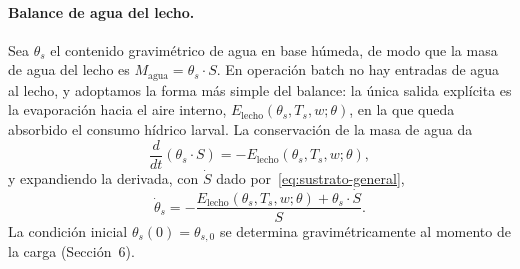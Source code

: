 \paragraph{Balance de agua del lecho.} Sea $\theta_s$ el contenido gravim\'etrico de agua en base h\'umeda, de modo que la masa de agua del lecho es $M_{\mathrm{agua}} = \theta_s \cdot S$. En operaci\'on batch no hay entradas de agua al lecho, y adoptamos la forma m\'as simple del balance: la \'unica salida expl\'icita es la evaporaci\'on hacia el aire interno, $E_{\mathrm{lecho}}(\theta_s, T_s, w; \theta)$, en la que queda absorbido el consumo h\'idrico larval. La conservaci\'on de la masa de agua da
\begin{equation}
\frac{d}{dt}\left(\theta_s \cdot S\right) = -E_{\mathrm{lecho}}(\theta_s, T_s, w; \theta),
\label{eq:agua-lecho}
\end{equation}
y expandiendo la derivada, con $\dot S$ dado por~\eqref{eq:sustrato-general},
\begin{equation}
\dot\theta_s = -\frac{E_{\mathrm{lecho}}(\theta_s, T_s, w; \theta) + \theta_s \cdot \dot S}{S}.
\label{eq:theta-lecho}
\end{equation}
La condici\'on inicial $\theta_s(0) = \theta_{s,0}$ se determina gravim\'etricamente al momento de la carga (Secci\'on~6).

